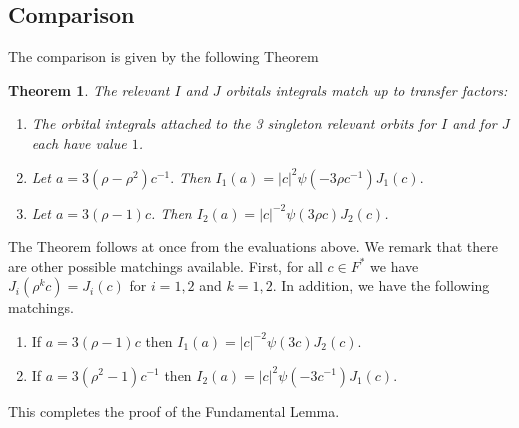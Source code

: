 \documentclass[12pt]{amsart}
\newcommand{\abs}[1]{\left|{#1}\right|}
\newtheorem{theorem}{Theorem}[section]
\theoremstyle{remark}
\begin{document}
\subsection{Comparison}
The comparison is given by the following Theorem

\begin{theorem}\label{degenerate equality} The relevant $I$ and $J$ orbitals integrals match up to transfer factors:
\begin{enumerate}
\item The orbital integrals attached to the 3 singleton relevant orbits for $I$ and for $J$ each have value $1$.
\item Let $a=3(\rho-\rho^2)c^{-1}.$ Then $I_1(a)=\abs{c}^{2}\psi(-3\rho c^{-1})J_1(c).$
\item Let $a=3(\rho-1)c$. Then
$I_2(a)=\abs{c}^{-2}\psi(3\rho c) J_2(c)$.
\end{enumerate}
\end{theorem}
The Theorem follows at once from the evaluations above.  We remark that there are other possible matchings available. First, for all $c\in F^*$ we have
$J_i(\rho^k c)=J_i(c)$ for $i=1,2$ and $k=1,2$. In addition, we have the following matchings.
\begin{enumerate}
\item 
If $a=3(\rho-1)c$ then $I_1(a)=\abs{c}^{-2}\psi(3c) J_2(c)$.
\item If $a=3(\rho^2-1)c^{-1}$ then $I_2(a)=\abs{c}^2 \psi(-3c^{-1}) J_1(c)$.
\end{enumerate}

This completes the proof of the Fundamental Lemma.
\end{document}
